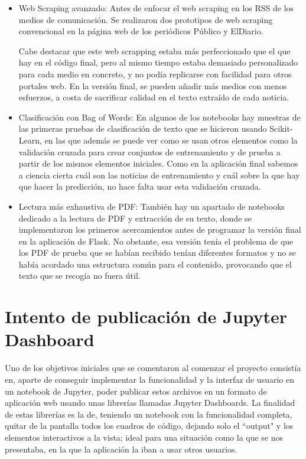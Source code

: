 \begin{itemize}

\item Web Scraping avanzado: Antes de enfocar el web scraping en los RSS de los medios de comunicación. Se realizaron dos prototipos de web scraping convencional en la página web de los periódicos Público y ElDiario.

Cabe destacar que este web scrapping estaba más perfeccionado que el que hay en el código final, pero al mismo tiempo estaba demasiado personalizado para cada medio en concreto, y no podía replicarse con facilidad para otros portales web. En la versión final, se pueden añadir más medios con menos esfuerzos, a costa de sacrificar calidad en el texto extraído de cada noticia.

\item Clasificación con Bag of Words: En algunos de los notebooks hay muestras de las primeras pruebas de clasificación de texto que se hicieron usando Scikit-Learn, en las que además se puede ver como se usan otros elementos como la validación cruzada para crear conjuntos de entrenamiento y de prueba a partir de los mismos elementos iniciales. Como en la aplicación final sabemos a ciencia cierta cuál son las noticias de entrenamiento y cuál sobre la que hay que hacer la predicción, no hace falta usar esta validación cruzada.

\item Lectura más exhaustiva de PDF: También hay un apartado de notebooks dedicado a la lectura de PDF y extracción de su texto, donde se implementaron los primeros acercamientos antes de programar la versión final en la aplicación de Flask. No obstante, esa versión tenía el problema de que los PDF de prueba que se habían recibido tenían diferentes formatos y no se había acordado una estructura común para el contenido, provocando que el texto que se recogía no fuera útil.

\end{itemize}

\section{Intento de publicación de Jupyter Dashboard}

Uno de los objetivos iniciales que se comentaron al comenzar el proyecto consistía en, aparte de conseguir implementar la funcionalidad y la interfaz de usuario en un notebook de Jupyter, poder publicar estos archivos en un formato de aplicación web usando unas librerías llamadas Jupyter Dashboards. La finalidad de estas librerías es la de, teniendo un notebook con la funcionalidad completa, quitar de la pantalla todos los cuadros de código, dejando solo el ``output" y los elementos interactivos a la vista; ideal para una situación como la que se nos presentaba, en la que la aplicación la iban a usar otros usuarios.

